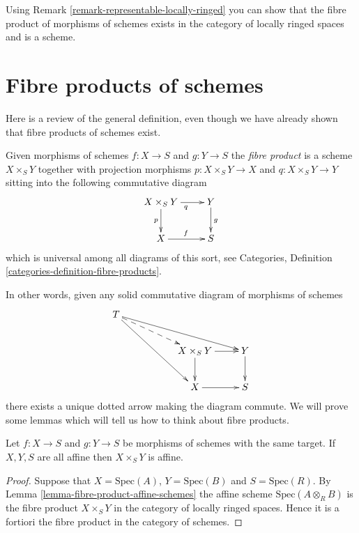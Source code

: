 \begin{remark}
\label{remark-fibre-product-schemes-locally-ringed}
Using Remark \ref{remark-representable-locally-ringed}
you can show that the fibre product of morphisms of schemes
exists in the category of locally ringed spaces and is a
scheme.
\end{remark}




\section{Fibre products of schemes}
\label{section-fibre-products}

\noindent
Here is a review of the general definition, even though
we have already shown that fibre products of schemes exist.

\begin{definition}
\label{definition-fibre-product}
Given morphisms of schemes $f : X \to S$ and $g : Y \to S$
the {\it fibre product} is a scheme $X\times_S Y$ together
with projection morphisms $p : X \times_S Y \to X$
and $q : X \times_S Y \to Y$ sitting into the following
commutative diagram
$$
\xymatrix{
X \times_S Y \ar[r]_q \ar[d]_p & Y \ar[d]^g \\
X \ar[r]^f & S
}
$$
which is universal among all diagrams of this sort,
see Categories, Definition \ref{categories-definition-fibre-products}.
\end{definition}

\noindent
In other words, given any solid commutative diagram of
morphisms of schemes
$$
\xymatrix{
T \ar[rrrd] \ar@{-->}[rrd] \ar[rrdd]
&
&
\\
&
&
X\times_S Y \ar[d] \ar[r]
&
Y \ar[d]
\\
&
&
X \ar[r]
&
S
}
$$
there exists a unique dotted arrow making the diagram commute.
We will prove some lemmas which will tell us how to think about
fibre products.

\begin{lemma}
\label{lemma-fibre-product-affines}
Let $f : X \to S$ and $g : Y \to S$ be morphisms of schemes
with the same target. If $X, Y, S$ are all affine then
$X \times_S Y$ is affine.
\end{lemma}

\begin{proof}
Suppose that $X = \text{Spec}(A)$, $Y = \text{Spec}(B)$
and $S = \text{Spec}(R)$. By Lemma \ref{lemma-fibre-product-affine-schemes}
the affine scheme $\text{Spec}(A \otimes_R B)$
is the fibre product $X \times_S Y$ in the category
of locally ringed spaces. Hence it is a fortiori the
fibre product in the category of schemes.
\end{proof}

